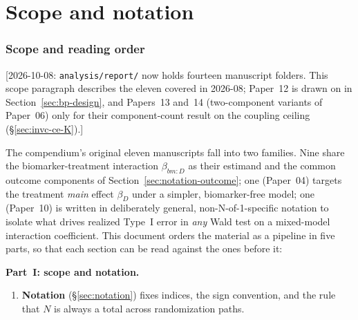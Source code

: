 \documentclass[11pt]{article}
\newcommand{\note}[1]{\textcolor{blue!60!black}{\small [#1]}}
\newcommand{\code}[1]{\texttt{#1}}
\begin{document}
\tableofcontents

\part{Scope and notation}

\section{Scope and reading order}

\note{2026-10-08: \code{analysis/report/} now holds fourteen manuscript
folders. This scope paragraph describes the eleven covered in 2026-08;
Paper~12 is drawn on in Section~\ref{sec:bp-design}, and Papers~13
and~14 (two-component variants of Paper~06) only for their
component-count result on the coupling ceiling
(\S\ref{sec:invc-ce-K}).}

The compendium's original eleven manuscripts fall into two families. Nine share
the biomarker-treatment interaction $\beta_{bm:D}$ as their estimand
and the common outcome components of Section~\ref{sec:notation-outcome}; one
(Paper~04) targets the treatment \emph{main} effect $\beta_D$ under a
simpler, biomarker-free model; one (Paper~10) is written in
deliberately general, non-N-of-1-specific notation to isolate what
drives realized Type~I error in \emph{any} Wald test on a mixed-model
interaction coefficient. This document orders the material as a pipeline
in five parts, so that each section can be read against the ones before
it:

\noindent\textbf{Part~I: scope and notation.}
\begin{enumerate}[label=\textbf{\arabic*.}, itemsep=2pt]
\item \textbf{Notation} (\S\ref{sec:notation}) fixes indices, the sign
  convention, and the rule that $N$ is always a total across
  randomization paths.
\end{enumerate}
\end{document}
